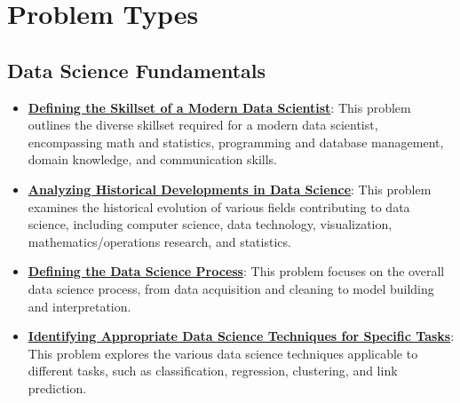 \documentclass{article}%
\begin{document}
%
\section{Problem Types}%
\label{sec:ProblemTypes}%
\subsection{Data Science Fundamentals}%
\label{subsec:DataScienceFundamentals}%
\begin{itemize}[leftmargin=*]%
\item \href{https://purdue.brightspace.com/d2l/common/assets/pdfjs-d2l-dist/1.0.14-legacy/web/viewer.html?file=\%2Fcontent\%2Fenforced\%2F1095465-WL.202510.CS24200.LE1\%2F02L1-datas-intro.pdf\%3Fou\%3D1095465\&lang=en-us\&container=d2l-fileviewer-rendered-pdf\&fullscreen=d2l-fileviewer-rendered-pdf-dialog\&height=667#page=9}{\textbf{Defining the Skillset of a Modern Data Scientist}}: This problem outlines the diverse skillset required for a modern data scientist, encompassing math and statistics, programming and database management, domain knowledge, and communication skills.%
\item \href{https://purdue.brightspace.com/d2l/common/assets/pdfjs-d2l-dist/1.0.14-legacy/web/viewer.html?file=\%2Fcontent\%2Fenforced\%2F1095465-WL.202510.CS24200.LE1\%2F02L1-datas-intro.pdf\%3Fou\%3D1095465\&lang=en-us\&container=d2l-fileviewer-rendered-pdf\&fullscreen=d2l-fileviewer-rendered-pdf-dialog\&height=667#page=10}{\textbf{Analyzing Historical Developments in Data Science}}: This problem examines the historical evolution of various fields contributing to data science, including computer science, data technology, visualization, mathematics/operations research, and statistics.%
\item \href{https://purdue.brightspace.com/d2l/common/assets/pdfjs-d2l-dist/1.0.14-legacy/web/viewer.html?file=\%2Fcontent\%2Fenforced\%2F1095465-WL.202510.CS24200.LE1\%2F02L1-datas-intro.pdf\%3Fou\%3D1095465\&lang=en-us\&container=d2l-fileviewer-rendered-pdf\&fullscreen=d2l-fileviewer-rendered-pdf-dialog\&height=667#page=23}{\textbf{Defining the Data Science Process}}: This problem focuses on the overall data science process, from data acquisition and cleaning to model building and interpretation.%
\item \href{https://purdue.brightspace.com/d2l/common/assets/pdfjs-d2l-dist/1.0.14-legacy/web/viewer.html?file=\%2Fcontent\%2Fenforced\%2F1095465-WL.202510.CS24200.LE1\%2F02L1-datas-intro.pdf\%3Fou\%3D1095465\&lang=en-us\&container=d2l-fileviewer-rendered-pdf\&fullscreen=d2l-fileviewer-rendered-pdf-dialog\&height=667#page=27}{\textbf{Identifying Appropriate Data Science Techniques for Specific Tasks}}: This problem explores the various data science techniques applicable to different tasks, such as classification, regression, clustering, and link prediction.%

\end{itemize}
\end{document}
